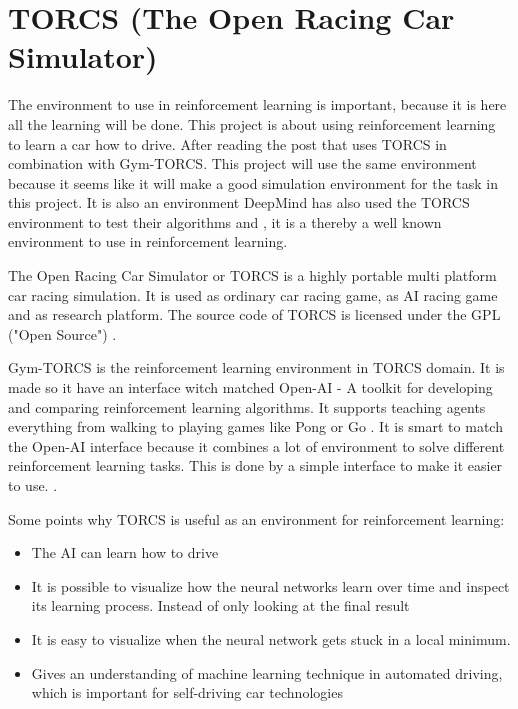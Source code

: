 \section{TORCS (The Open Racing Car Simulator)}
\label{sec:TORCS}
The environment to use in reinforcement learning is important, because it is here all the learning will be done. This project is about using reinforcement learning to learn a car how to drive. After reading the post \cite{DDPG_Torcs} that uses TORCS in combination with Gym-TORCS. This project will use the same environment because it seems like it will make a good simulation environment for the task in this project. It is also an environment DeepMind has also used the TORCS environment to test their algorithms \cite{DBLP:journals/corr/LillicrapHPHETS15} and \cite{DBLP:journals/corr/MnihBMGLHSK16}, it is a thereby a well known environment to use in reinforcement learning. 

The Open Racing Car Simulator or TORCS is a highly portable multi platform car racing simulation. It is used as ordinary car racing game, as AI racing game and as research platform. The source code of TORCS is licensed under the GPL ("Open Source") \cite{TORCS_website}. 

Gym-TORCS is the reinforcement learning environment in TORCS domain. It is made so it have an interface witch matched Open-AI - A toolkit for developing and comparing reinforcement learning algorithms. It supports teaching agents everything from walking to playing games like Pong or Go \cite{OPENAI_website}. It is smart to match the Open-AI interface because it combines a lot of environment to solve different reinforcement learning tasks. This is done by a simple interface to make it easier to use. \cite{Gym_TORCS_website}.

Some points why TORCS is useful as an environment for reinforcement learning:
\begin{itemize}
	\item The AI can learn how to drive
	\item It is possible to visualize how the neural networks learn over time and inspect its learning process. Instead of only looking at the final result
	\item It is easy to visualize when the neural network gets stuck in a local minimum.
	\item Gives an understanding of machine learning technique in automated driving, which is important for self-driving car technologies 
\end{itemize}
      
